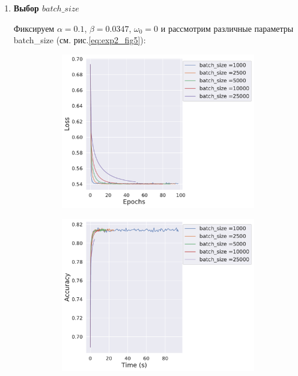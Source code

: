 \begin{enumerate}
	\item {\bfseries  Выбор $batch\_size$}
	
	Фиксируем $\alpha = 0.1$, $\beta = 0.0347$, $\omega_0=0$ и рассмотрим различные параметры batch\_size (см. рис.\ref{eq:exp2_fig5}):
	\begin{figure}[h]
        \begin{subfigure}{.5\textwidth}
            \centering
            \includegraphics[width=\linewidth]{./experiment2/batch_size/sgd_loss_iters.pdf}
            \caption{}
        \end{subfigure}%
        \begin{subfigure}{.5\textwidth}
            \centering
            \includegraphics[width=\linewidth]{./experiment2/batch_size/sgd_acc_time.pdf}

\end{subfigure}
\end{figure}
\end{enumerate}
